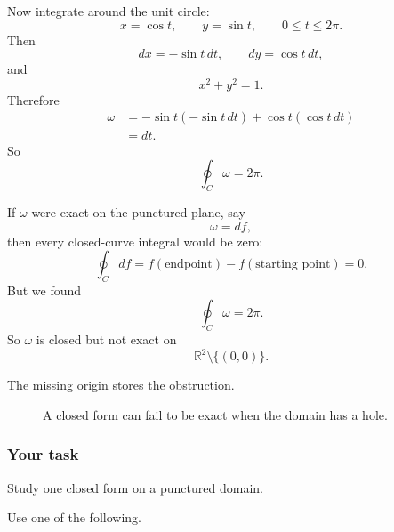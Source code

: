 Now integrate around the unit circle:
\[
    x=\cos t,\qquad y=\sin t,\qquad 0\le t\le2\pi.
\]
Then
\[
    dx=-\sin t\,dt,
    \qquad
    dy=\cos t\,dt,
\]
and
\[
    x^2+y^2=1.
\]
Therefore
\[
\begin{aligned}
    \omega
    &=
    -\sin t(-\sin t\,dt)+\cos t(\cos t\,dt)\\
    &=
    dt.
\end{aligned}
\]
So
\[
\boxed{
    \oint_C\omega=2\pi.
}
\]

If \(\omega\) were exact on the punctured plane, say
\[
    \omega=df,
\]
then every closed-curve integral would be zero:
\[
    \oint_C df=f(\text{endpoint})-f(\text{starting point})=0.
\]
But we found
\[
    \oint_C\omega=2\pi.
\]
So \(\omega\) is closed but not exact on
\[
    \mathbb R^2\setminus\{(0,0)\}.
\]

The missing origin stores the obstruction.

\begin{figure}[h]
\centering
{}
\caption{A closed form can fail to be exact when the domain has a hole.}
\end{figure}

\subsubsection*{Your task}

Study one closed form on a punctured domain.

Use one of the following.

